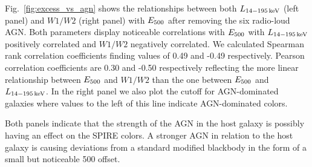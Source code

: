 Fig.~\ref{fig:excess_vs_agn} shows the relationships between both $L_{\rm 14-195\,keV}$ (left panel) and $W1/W2$ (right panel) with $E_{\rm 500}$ after removing the six radio-loud AGN. Both parameters display noticeable correlations with $E_{\rm 500}$ with $L_{\rm 14-195\,keV}$ positively correlated and $W1/W2$ negatively correlated. We calculated Spearman rank correlation coefficients finding values of 0.49 and -0.49 respectively. Pearson correlation coefficients are 0.30 and -0.50 respectively reflecting the more linear relationship between $E_{\rm 500}$ and $W1/W2$ than the one between $E_{\rm 500}$ and $L_{\rm 14-195\,keV}$. In the right panel we also plot the \citet{Stern:2012mz} cutoff for AGN-dominated galaxies where values to the left of this line indicate AGN-dominated colors. 

Both panels indicate that the strength of the AGN in the host galaxy is possibly having an effect on the SPIRE colors. A stronger AGN in relation to the host galaxy is causing deviations from a standard modified blackbody in the form of a small but noticeable 500 \um{} offset.


  
  